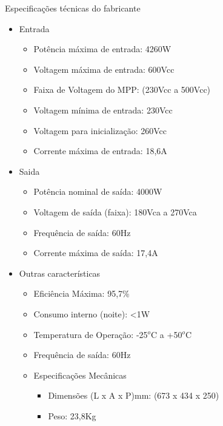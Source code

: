 	Especifica\c{c}\~oes t\'ecnicas do fabricante
	
\begin{itemize}
         \item Entrada
                  \begin{itemize}
                            \item Pot\^encia m\'axima de entrada: 4260W
                            \item Voltagem m\'axima de entrada: 600Vcc
                            \item Faixa de Voltagem do MPP: (230Vcc a 500Vcc)
                            \item Voltagem m\'inima de entrada: 230Vcc
                            \item Voltagem para inicializa\c{c}\~ao: 260Vcc
                            \item Corrente m\'axima de entrada: 18,6A
                  \end{itemize}
         \item Saida
                  \begin{itemize}
                            \item Pot\^encia nominal de sa\'ida: 4000W
                            \item Voltagem de sa\'ida (faixa): 180Vca a 270Vca
                            \item Frequ\^encia de sa\'ida: 60Hz
                            \item Corrente m\'axima de sa\'ida: 17,4A
                  \end{itemize}
          \item Outras caracter\'isticas 
                  \begin{itemize}
                            \item Efici\^encia M\'axima: 95,7\%
                            \item Consumo interno (noite): <1W
                            \item Temperatura de Opera\c{c}\~ao: -25$^{o}$C a +50$^{o}$C
                            \item Frequ\^encia de sa\'ida: 60Hz
                            \item Especifica\c{c}\~oes Mec\^anicas
                                    \begin{itemize}
                                             \item Dimens\~oes (L x A x P)mm: (673 x 434 x 250)
                                             \item Peso: 23,8Kg
                                    \end{itemize}
                  \end{itemize}
\end{itemize}

